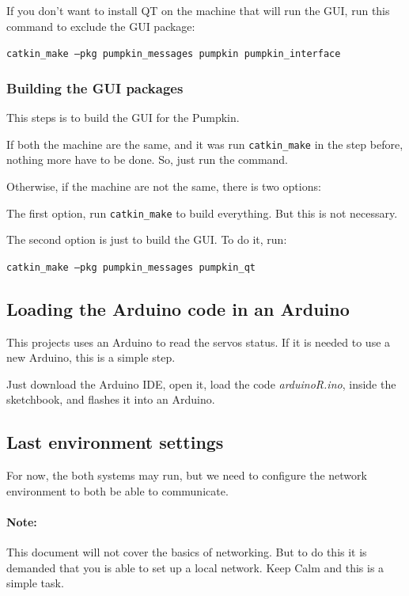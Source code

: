 \documentclass[oneside,a4paper,titlepage]{article}
\begin{document}
If you don't want to install QT on the machine that will run the GUI, run this command to exclude the GUI package:

\begin{center}
\texttt{catkin\_make --pkg pumpkin\_messages pumpkin pumpkin\_interface}
\end{center}

\subsubsection{Building the GUI packages}

This steps is to build the GUI for the Pumpkin.

If both the machine are the same, and it was run \texttt{catkin\_make} in the step before, nothing more have to be done. So, just run the command.

Otherwise, if the machine are not the same, there is two options:

The first option, run \texttt{catkin\_make} to build everything. But this is not necessary.

The second option is just to build the GUI. To do it, run:

\begin{center}
\texttt{catkin\_make --pkg pumpkin\_messages pumpkin\_qt}
\end{center}

\subsection{Loading the Arduino code in an Arduino}

This projects uses an Arduino to read the servos status. If it is needed to use a new Arduino, this is a simple step.

Just download the Arduino IDE, open it, load the code \emph{arduinoR.ino}, inside the sketchbook, and flashes it into an Arduino.

\subsection{Last environment settings}

For now, the both systems may run, but we need to configure the network environment to both be able to communicate.

\paragraph{Note: } This document will not cover the basics of networking. But to do this it is demanded that you is able to set up a local network. Keep Calm and this is a simple task.
\end{document}
